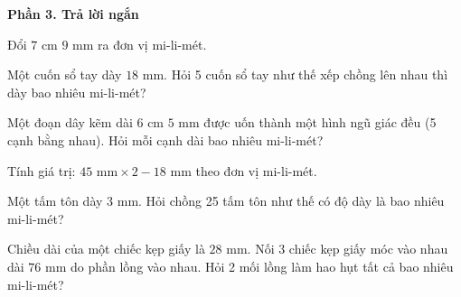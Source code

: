 \textbf{Phần 3. Trả lời ngắn}

\begin{ex} %
Đổi $7\text{ cm } 9\text{ mm}$ ra đơn vị mi-li-mét.
\end{ex}

\begin{ex} %
Một cuốn sổ tay dày $18\text{ mm}$. Hỏi 5 cuốn sổ tay như thế xếp chồng lên nhau thì dày bao nhiêu mi-li-mét?
\end{ex}

\begin{ex} %
Một đoạn dây kẽm dài $6\text{ cm } 5\text{ mm}$ được uốn thành một hình ngũ giác đều (5 cạnh bằng nhau). Hỏi mỗi cạnh dài bao nhiêu mi-li-mét?
\end{ex}

\begin{ex} %
Tính giá trị: $45\text{ mm} \times 2 - 18\text{ mm}$ theo đơn vị mi-li-mét.
\end{ex}

\begin{ex} %
Một tấm tôn dày $3\text{ mm}$. Hỏi chồng 25 tấm tôn như thế có độ dày là bao nhiêu mi-li-mét?
\end{ex}

\begin{ex} %
Chiều dài của một chiếc kẹp giấy là $28\text{ mm}$. Nối 3 chiếc kẹp giấy móc vào nhau dài $76\text{ mm}$ do phần lồng vào nhau. Hỏi 2 mối lồng làm hao hụt tất cả bao nhiêu mi-li-mét?
\end{ex}
